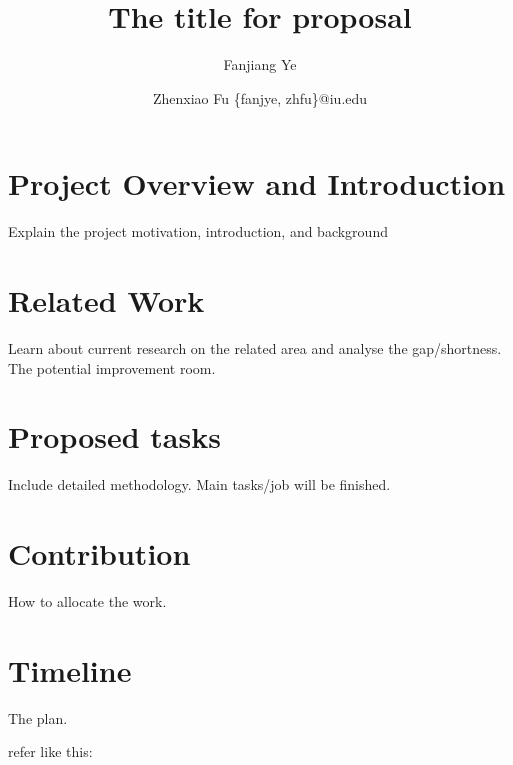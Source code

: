 \documentclass{article}
\title{The title for proposal}
\author{
Fanjiang Ye\and
Zhenxiao Fu
\affiliations
\emails
\{fanjye, zhfu\}@iu.edu
}
\begin{document}
\maketitle

\section{Project Overview and Introduction}

Explain the project motivation, introduction, and background

\section{Related Work}
Learn about current research on the related area and analyse the gap/shortness. The potential improvement room. 

\section{Proposed tasks}
Include detailed methodology. Main tasks/job will be finished.

\section{Contribution}

How to allocate the work.

\section{Timeline}
The plan. 

refer like this:
~\cite{gls:hypertrees,levesque:functional-foundations}



\end{document}

